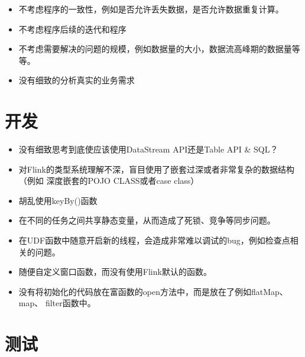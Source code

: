 \documentclass[cn,11pt,chinese]{elegantbook}
\begin{document}
\begin{itemize}
\item 不考虑程序的一致性，例如是否允许丢失数据，是否允许数据重复计算。

  
\item 不考虑程序后续的迭代和程序
\item 不考虑需要解决的问题的规模，例如数据量的大小，数据流高峰期的数据量等等。
\item 没有细致的分析真实的业务需求
\end{itemize}

\section{开发}

\begin{itemize}
\item 没有细致思考到底使应该使用DataStream API还是Table API \& SQL？
\item 对Flink的类型系统理解不深，盲目使用了嵌套过深或者非常复杂的数据结构（例如
  深度嵌套的POJO CLASS或者case class）
\item 胡乱使用keyBy()函数
\item 在不同的任务之间共享静态变量，从而造成了死锁、竞争等同步问题。
\item 在UDF函数中随意开启新的线程，会造成非常难以调试的bug，例如检查点相关的问题。
\item 随便自定义窗口函数，而没有使用Flink默认的函数。
\item 没有将初始化的代码放在富函数的open方法中，而是放在了例如flatMap、map、
  filter函数中。
\end{itemize}

\section{测试}
\end{document}
